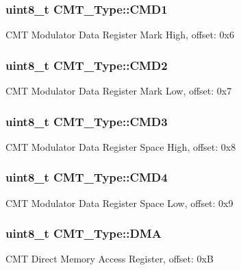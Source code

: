 \subsubsection[{\texorpdfstring{C\+M\+D1}{CMD1}}]{ uint8\+\_\+t C\+M\+T\+\_\+\+Type\+::\+C\+M\+D1}\hypertarget{structCMT__Type_aba5e9b2b5339e8d9a41aaedd54fbd21b}{}\label{structCMT__Type_aba5e9b2b5339e8d9a41aaedd54fbd21b}
C\+MT Modulator Data Register Mark High, offset\+: 0x6 
\subsubsection[{\texorpdfstring{C\+M\+D2}{CMD2}}]{ uint8\+\_\+t C\+M\+T\+\_\+\+Type\+::\+C\+M\+D2}\hypertarget{structCMT__Type_aabbd5d0c8076482098448e7edbde4cf3}{}\label{structCMT__Type_aabbd5d0c8076482098448e7edbde4cf3}
C\+MT Modulator Data Register Mark Low, offset\+: 0x7 
\subsubsection[{\texorpdfstring{C\+M\+D3}{CMD3}}]{ uint8\+\_\+t C\+M\+T\+\_\+\+Type\+::\+C\+M\+D3}\hypertarget{structCMT__Type_a1baaa54d95afb3bf83179634f691a3f0}{}\label{structCMT__Type_a1baaa54d95afb3bf83179634f691a3f0}
C\+MT Modulator Data Register Space High, offset\+: 0x8 
\subsubsection[{\texorpdfstring{C\+M\+D4}{CMD4}}]{ uint8\+\_\+t C\+M\+T\+\_\+\+Type\+::\+C\+M\+D4}\hypertarget{structCMT__Type_a66c3bacb73c9dd2584e77ba8414deb4a}{}\label{structCMT__Type_a66c3bacb73c9dd2584e77ba8414deb4a}
C\+MT Modulator Data Register Space Low, offset\+: 0x9 
\subsubsection[{\texorpdfstring{D\+MA}{DMA}}]{ uint8\+\_\+t C\+M\+T\+\_\+\+Type\+::\+D\+MA}\hypertarget{structCMT__Type_a691ca71ac3ecfde5c5f2c9ed46f96338}{}\label{structCMT__Type_a691ca71ac3ecfde5c5f2c9ed46f96338}
C\+MT Direct Memory Access Register, offset\+: 0xB 
